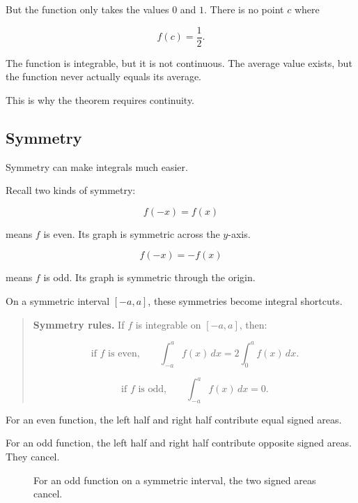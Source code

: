 But the function only takes the values \(0\) and \(1\).  There is no point \(c\) where

\[
f(c)=\frac12.
\]

The function is integrable, but it is not continuous.  The average value exists, but the
function never actually equals its average.

This is why the theorem requires continuity.

\subsection{Symmetry}
\label{subsec:integral-symmetry}

Symmetry can make integrals much easier.

Recall two kinds of symmetry:

\[
f(-x)=f(x)
\]

means \(f\) is even.  Its graph is symmetric across the \(y\)-axis.

\[
f(-x)=-f(x)
\]

means \(f\) is odd.  Its graph is symmetric through the origin.

On a symmetric interval \([-a,a]\), these symmetries become integral shortcuts.

\begin{quote}
\textbf{Symmetry rules.}
If \(f\) is integrable on \([-a,a]\), then:

\[
\boxed{
\text{if }f\text{ is even,}\qquad
\int_{-a}^{a} f(x)\,dx
=
2\int_0^a f(x)\,dx.
}
\]

\[
\boxed{
\text{if }f\text{ is odd,}\qquad
\int_{-a}^{a} f(x)\,dx
=
0.
}
\]
\end{quote}

For an even function, the left half and right half contribute equal signed areas.

For an odd function, the left half and right half contribute opposite signed areas.  They
cancel.

\begin{figure}[h]
\centering
{}
\caption{For an odd function on a symmetric interval, the two signed areas cancel.}
\label{fig:odd-function-cancellation}
\end{figure}

